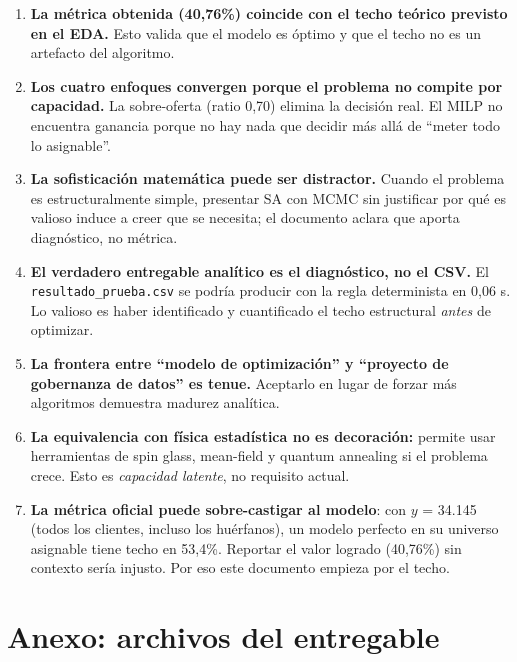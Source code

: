 \documentclass[11pt,a4paper]{article}
\begin{document}
\begin{enumerate}
    \item \textbf{La métrica obtenida (40,76\%) coincide con el techo teórico previsto en el EDA.} Esto valida que el modelo es óptimo y que el techo no es un artefacto del algoritmo.

    \item \textbf{Los cuatro enfoques convergen porque el problema no compite por capacidad.} La sobre-oferta (ratio 0,70) elimina la decisión real. El MILP no encuentra ganancia porque no hay nada que decidir más allá de ``meter todo lo asignable''.

    \item \textbf{La sofisticación matemática puede ser distractor.} Cuando el problema es estructuralmente simple, presentar SA con MCMC sin justificar por qué es valioso induce a creer que se necesita; el documento aclara que aporta diagnóstico, no métrica.

    \item \textbf{El verdadero entregable analítico es el diagnóstico, no el CSV.} El \texttt{resultado\_prueba.csv} se podría producir con la regla determinista en 0,06 s. Lo valioso es haber identificado y cuantificado el techo estructural \emph{antes} de optimizar.

    \item \textbf{La frontera entre ``modelo de optimización'' y ``proyecto de gobernanza de datos'' es tenue.} Aceptarlo en lugar de forzar más algoritmos demuestra madurez analítica.

    \item \textbf{La equivalencia con física estadística no es decoración:} permite usar herramientas de spin glass, mean-field y quantum annealing si el problema crece. Esto es \emph{capacidad latente}, no requisito actual.

    \item \textbf{La métrica oficial puede sobre-castigar al modelo}: con $y$ = 34.145 (todos los clientes, incluso los huérfanos), un modelo perfecto en su universo asignable tiene techo en 53,4\%. Reportar el valor logrado (40,76\%) sin contexto sería injusto. Por eso este documento empieza por el techo.
\end{enumerate}

\section*{\color{bconegro}Anexo: archivos del entregable}
\end{document}
